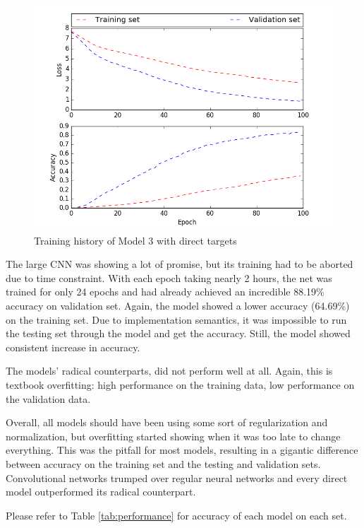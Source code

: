 \documentclass{article}
\begin{document}
\begin{CJK*}{UTF8}{min}
\begin{figure}[h]
    \centering
    \includegraphics[width=\textwidth]{accuracy_and_loss}
    \caption{Training history of Model 3 with direct targets}
    \label{fig:history}
\end{figure}

The large CNN was showing a lot of promise, but its training had to be aborted due to time constraint. With each epoch taking nearly 2 hours, the net was trained for only 24 epochs and had already achieved an incredible 88.19\% accuracy on validation set. Again, the model showed a lower accuracy (64.69\%) on the training set. Due to implementation semantics, it was impossible to run the testing set through the model and get the accuracy. Still, the model showed consistent increase in accuracy.

The models' radical counterparts, did not perform well at all. Again, this is textbook overfitting: high performance on the training data, low performance on the validation data.

Overall, all models should have been using some sort of regularization and normalization, but overfitting started showing when it was too late to change everything. This was the pitfall for most models, resulting in a gigantic difference between accuracy on the training set and the testing and validation sets. Convolutional networks trumped over regular neural networks and every direct model outperformed its radical counterpart.

Please refer to Table \ref{tab:performance} for accuracy of each model on each set.


\end{CJK*}
\end{document}
